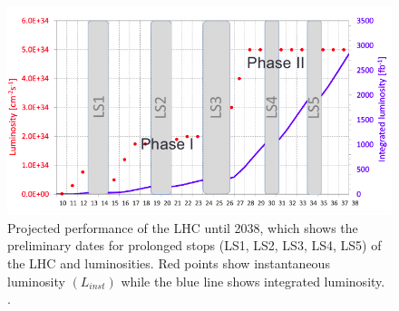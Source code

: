 \begin{figure}[H]
  \centering
  \includegraphics[width=0.7 \columnwidth]{./lumi_projection.png}
  \caption{ \onehalfspacing Projected performance of the LHC until 2038, which shows the preliminary dates for prolonged stops (LS1, LS2, LS3, LS4, LS5) of the LHC and luminosities. Red points show instantaneous luminosity $(L_{inst})$ while the blue line shows integrated luminosity. \cite{collaborations2019report}.}
  \label{fig:LHCPlans}
\end{figure}
